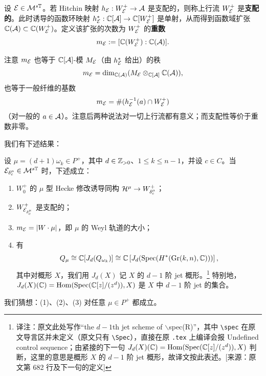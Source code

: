 \begin{definition}
设 ${\mathcal E}\in {\mathcal{M}}^{s{\mathbb{T}}}$。若 Hitchin 映射 $h_{\mathcal E}:W^+_{\mathcal E}\to {\mathcal{A}}$ 是支配的，则称上行流 $W^+_{\mathcal E}$ 是\textbf{支配的}。此时诱导的函数环映射 $h_{\mathcal E}^*: \mathbb{C}[{{\mathcal{A}}}]\to \mathbb{C}[{W^+_{\mathcal E}}]$ 是单射，从而得到函数域扩张 $\mathbb{C}({\mathcal{A}})\subset \mathbb{C}(W^+_{\mathcal E})$。定义该扩张的次数为 $W^+_{\mathcal E}$ 的\textbf{重数}
\[
m_{\mathcal E}:=[ \mathbb{C}(W^+_{\mathcal E}):\mathbb{C}({\mathcal{A}})].
\]
\end{definition}

注意 $m_{\mathcal E}$ 也等于 $\mathbb{C}[{\mathcal{A}}]$-模 $M_{\mathcal E}$（由 $h_{\mathcal E}^*$ 给出）的秩
\[
m_{\mathcal E}=\dim_{\mathbb{C}({\mathcal{A}})} (M_{\mathcal E}\otimes_{\mathbb{C}[{\mathcal{A}}]} \mathbb{C}({\mathcal{A}})),
\]
也等于一般纤维的基数
\[
m_{\mathcal E}=\#(h_{\mathcal E}^{-1}(a)\cap W^+_{\mathcal E})
\]
（对一般的 $a\in{\mathcal{A}}$）。注意后两种说法对一切上行流都有意义；而支配性等价于重数非零。

我们有下述结果：

\begin{theorem}\label{conjecturewobbly}
设 $\mu=(d+1)\omega_k\in P^+$，其中 $d\in \mathbb{Z}_{>0}$、$1\leq k\leq n-1$，并设 $c\in C$。当 ${\mathcal E}_{\delta^\mu_c}\in {\mathcal{M}}^{s{\mathbb{T}}}$ 时，下述成立：
\begin{enumerate}
	\item $W^+_0$ 的 $\mu$ 型 Hecke 修改诱导同构 $\mathcal{H}^\mu \to W^+_{\delta^\mu_c}$；
	\item $W^+_{{\mathcal E}_{\delta^\mu_c}}$ 是支配的；
	\item $m_{\mathcal E}=|W\cdot \mu|$，即 $\mu$ 的 Weyl 轨道的大小；
	\item 有
	\[
	Q_{\mu}\cong \mathbb{C}[J_d(Q_{\omega_k})]\cong \mathbb{C}\left[J_d(\operatorname{Spec}(H^*(\textnormal{Gr}(k,n),\mathbb{C})))\right],
	\]
	其中对概形 $X$，我们用 $J_d(X)$ 记 $X$ 的 $d-1$ 阶 jet 概形。\footnote{译注：原文此处写作“the $d-1$th jet scheme of $\backslash$spec(R)”，其中 \texttt{\textbackslash spec} 在原文导言区并未定义（原文只有 \texttt{\textbackslash Spec}），直接在原 \texttt{.tex} 上编译会报 Undefined control sequence；由紧接的下一句 $J_d(X)(\mathbb{C})=\operatorname{Hom}(\operatorname{Spec}(\mathbb{C}[z]/(z^d)),X)$ 判断，这里的意思是概形 $X$ 的 $d-1$ 阶 jet 概形，故译文按此表述。[来源：原文第 682 行及下一句的定义]}
	特别地，$J_d(X)(\mathbb{C})=\operatorname{Hom}(\operatorname{Spec}(\mathbb{C}[z]/(z^d)),X)$ 是 $X$ 中 $d-1$ 阶 jet 的集合。
\end{enumerate}
\end{theorem}

\begin{remark}
我们猜想：(1)、(2)、(3) 对任意 $\mu \in P^+$ 都成立。
\end{remark}

